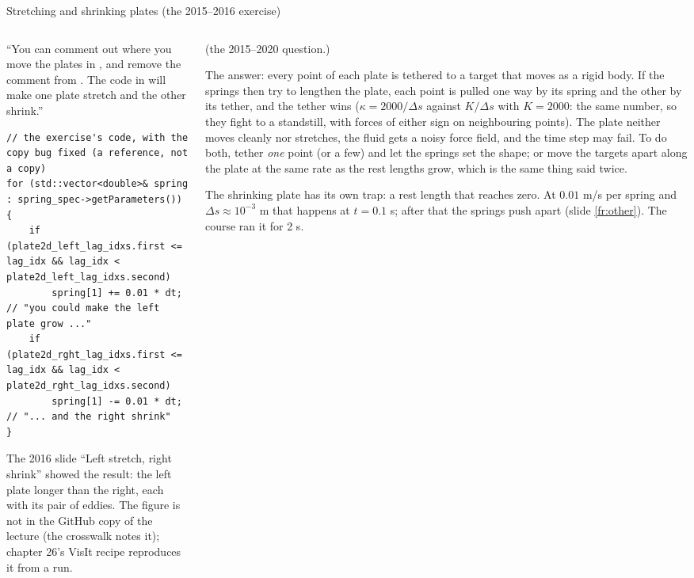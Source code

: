 \documentclass[aspectratio=169,11pt]{beamer}
\begin{document}
\begin{frame}[fragile]{Stretching and shrinking plates (the 2015--2016 exercise)}
\label{fr:stretch}
\begin{columns}[T,onlytextwidth]
\begin{column}{0.5\textwidth}
\scriptsize ``You can comment out where you move the plates in , and remove the comment from . The code in  will make one plate stretch and the other shrink.''
\begin{lstlisting}[style=cpptiny]
// the exercise's code, with the copy bug fixed (a reference, not a copy)
for (std::vector<double>& spring : spring_spec->getParameters())
{
    if (plate2d_left_lag_idxs.first <= lag_idx && lag_idx < plate2d_left_lag_idxs.second)
        spring[1] += 0.01 * dt;   // "you could make the left plate grow ..."
    if (plate2d_rght_lag_idxs.first <= lag_idx && lag_idx < plate2d_rght_lag_idxs.second)
        spring[1] -= 0.01 * dt;   // "... and the right shrink"
}
\end{lstlisting}
\scriptsize The 2016 slide ``Left stretch, right shrink'' showed the result: the left plate longer than the right, each with its pair of eddies. The figure is not in the GitHub copy of the lecture (the crosswalk notes it); chapter 26's VisIt recipe reproduces it from a run.
\end{column}
\begin{column}{0.48\textwidth}
\scriptsize {} (the 2015--2020 question.)
\vspace{1mm}

\scriptsize The answer: every point of each plate is tethered to a target that moves as a rigid body. If the springs then try to lengthen the plate, each point is pulled one way by its spring and the other by its tether, and the tether wins ($\kappa = 2000/\Delta s$ against $K/\Delta s$ with $K = 2000$: the same number, so they fight to a standstill, with forces of either sign on neighbouring points). The plate neither moves cleanly nor stretches, the fluid gets a noisy force field, and the time step may fail. To do both, tether \emph{one} point (or a few) and let the springs set the shape; or move the targets apart along the plate at the same rate as the rest lengths grow, which is the same thing said twice.
\vspace{1mm}

\scriptsize The shrinking plate has its own trap: a rest length that reaches zero. At $0.01$ m/s per spring and $\Delta s \approx 10^{-3}$ m that happens at $t = 0.1$ s; after that the springs push apart (slide \ref{fr:other}). The course ran it for 2 s.
\end{column}
\end{columns}
\end{frame}
\end{document}
